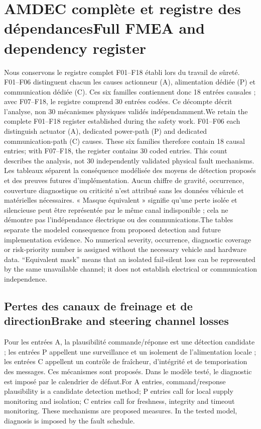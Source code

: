 \documentclass[11pt,a4paper,oneside]{report}
\newcommand{\bi}[2]{\iffrench #2\else #1\fi}
\newcommand{\chap}[2]{\chapter{\bi{#1}{#2}}}
\renewcommand{\sec}[2]{\section{\bi{#1}{#2}}}
\begin{document}
\chap{Full FMEA and dependency register}{AMDEC complète et registre des dépendances}
\label{app:fmea}
\bi{We retain the complete F01--F18 register established during the safety work. F01--F06 each distinguish actuator (A), dedicated power-path (P) and dedicated communication-path (C) causes. These six families therefore contain 18 causal entries; with F07--F18, the register contains 30 coded entries. This count describes the analysis, not 30 independently validated physical fault mechanisms.}{Nous conservons le registre complet F01--F18 établi lors du travail de sûreté. F01--F06 distinguent chacun les causes actionneur (A), alimentation dédiée (P) et communication dédiée (C). Ces six familles contiennent donc 18 entrées causales ; avec F07--F18, le registre comprend 30 entrées codées. Ce décompte décrit l'analyse, non 30 mécanismes physiques validés indépendamment.}
\bi{The tables separate the modeled consequence from proposed detection and future implementation evidence. No numerical severity, occurrence, diagnostic coverage or risk-priority number is assigned without the necessary vehicle and hardware data. ``Equivalent mask'' means that an isolated fail-silent loss can be represented by the same unavailable channel; it does not establish electrical or communication independence.}{Les tableaux séparent la conséquence modélisée des moyens de détection proposés et des preuves futures d'implémentation. Aucun chiffre de gravité, occurrence, couverture diagnostique ou criticité n'est attribué sans les données véhicule et matérielles nécessaires. « Masque équivalent » signifie qu'une perte isolée et silencieuse peut être représentée par le même canal indisponible ; cela ne démontre pas l'indépendance électrique ou des communications.}
\sec{Brake and steering channel losses}{Pertes des canaux de freinage et de direction}
\bi{For A entries, command/response plausibility is a candidate detection method; P entries call for local supply monitoring and isolation; C entries call for freshness, integrity and timeout monitoring. These mechanisms are proposed measures. In the tested model, diagnosis is imposed by the fault schedule.}{Pour les entrées A, la plausibilité commande/réponse est une détection candidate ; les entrées P appellent une surveillance et un isolement de l'alimentation locale ; les entrées C appellent un contrôle de fraîcheur, d'intégrité et de temporisation des messages. Ces mécanismes sont proposés. Dans le modèle testé, le diagnostic est imposé par le calendrier de défaut.}
\begingroup\small{}
\end{document}
